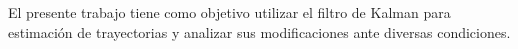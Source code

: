 	El presente trabajo tiene como objetivo utilizar el filtro de Kalman para estimación de trayectorias y analizar sus modificaciones ante diversas condiciones.
